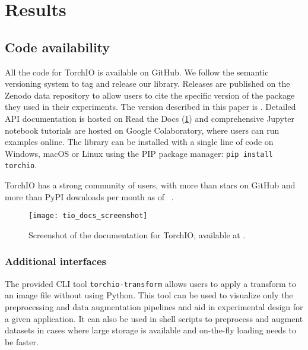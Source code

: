 \section{Results}

\subsection{Code availability}

All the code for TorchIO is available on GitHub.
We follow the semantic versioning system \cite{preston-werner_semantic_2020} to tag and release our library.
Releases are published on the Zenodo data repository to allow users to cite the specific version of the package they used in their experiments.
The version described in this paper is \torchioversion \cite{perez-garcia_fepegartorchio_2020}.
Detailed \ac{API} documentation is hosted on Read the Docs (\cref{fig:tio_docs}) and comprehensive Jupyter notebook tutorials are hosted on Google Colaboratory, where users can run examples online.
The library can be installed with a single line of code on Windows, macOS or Linux using the \ac{PIP} package manager: \texttt{pip install torchio}.

TorchIO has a strong community of users, with more than \torchiostars stars on GitHub and more than \torchiomonthdownloads \ac{PyPI} downloads per month as of \monthname~\the\year.

\begin{figure}
  \centering
  \texttt{[image: tio\_docs\_screenshot]}
  \caption[TorchIO documentation]{
    Screenshot of the documentation for TorchIO, available at .
  }
  \label{fig:tio_docs}
\end{figure}


\subsubsection{Additional interfaces}

The provided \ac{CLI} tool \texttt{torchio-transform} allows users to apply a transform to an image file without using Python.
This tool can be used to visualize only the preprocessing and data augmentation pipelines and aid in experimental design for a given application.
It can also be used in shell scripts to preprocess and augment datasets in cases where large storage is available and on-the-fly loading needs to be faster.

